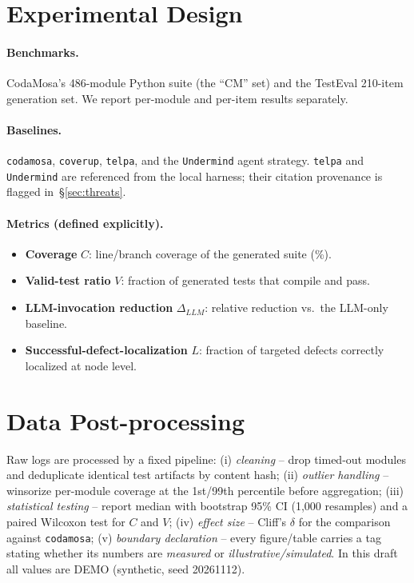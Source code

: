 \documentclass[11pt]{article}
\begin{document}
\section{Experimental Design}
\paragraph{Benchmarks.} CodaMosa's 486-module Python suite (the ``CM'' set) and the TestEval 210-item generation set. We report per-module and per-item results separately.
\paragraph{Baselines.} \texttt{codamosa}, \texttt{coverup}, \texttt{telpa}, and the \texttt{Undermind} agent strategy. \texttt{telpa} and \texttt{Undermind} are referenced from the local harness; their citation provenance is flagged in~\S\ref{sec:threats}.
\paragraph{Metrics (defined explicitly).}
\begin{itemize}
  \item \textbf{Coverage} $C$: line/branch coverage of the generated suite (\%).
  \item \textbf{Valid-test ratio} $V$: fraction of generated tests that compile and pass.
  \item \textbf{LLM-invocation reduction} $\Delta_{LLM}$: relative reduction vs.\ the LLM-only baseline.
  \item \textbf{Successful-defect-localization} $L$: fraction of targeted defects correctly localized at node level.
\end{itemize}

\section{Data Post-processing}
\label{sec:post}
Raw logs are processed by a fixed pipeline: (i) \emph{cleaning} -- drop timed-out modules and deduplicate identical test artifacts by content hash; (ii) \emph{outlier handling} -- winsorize per-module coverage at the 1st/99th percentile before aggregation; (iii) \emph{statistical testing} -- report median with bootstrap 95\% CI (1,000 resamples) and a paired Wilcoxon test for $C$ and $V$; (iv) \emph{effect size} -- Cliff's $\delta$ for the comparison against \texttt{codamosa}; (v) \emph{boundary declaration} -- every figure/table carries a tag stating whether its numbers are \emph{measured} or \emph{illustrative/simulated}. \textcolor{warn}{In this draft all values are DEMO (synthetic, seed 20261112).}
\end{document}
